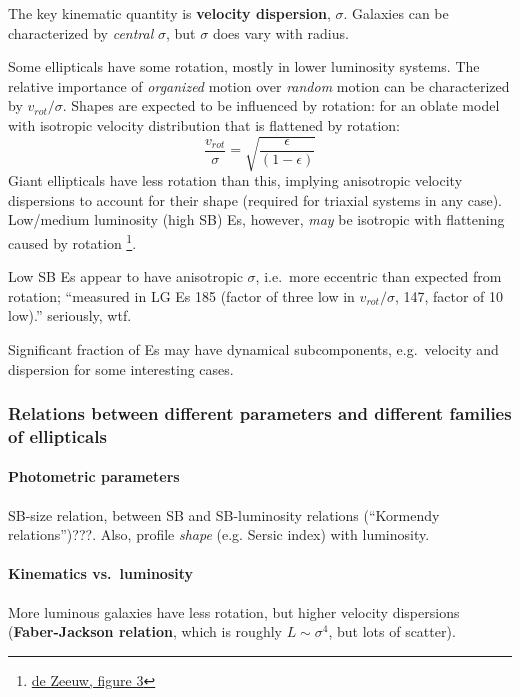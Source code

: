 \documentclass{article}
\newcommand{\mynotes}[1]{\textcolor{cadmiumgreen}{#1}}
\begin{document}
The key kinematic quantity is \textbf{velocity dispersion}, $\sigma$.
Galaxies can be characterized by \emph{central} $\sigma$, but $\sigma$ does
vary with radius.

Some ellipticals have some rotation, mostly in lower luminosity systems.
The relative importance of \emph{organized} motion over \emph{random} motion
can be characterized by $v_{rot}/\sigma$. Shapes are expected to be influenced
by rotation: for an oblate model with isotropic velocity distribution that is
flattened by rotation:
\[
    \frac{v_{rot}}{\sigma} = \sqrt{\frac{\epsilon}{\left(1-\epsilon\right)}}
    \]
Giant ellipticals have less rotation than this, implying anisotropic velocity
dispersions to account for their shape (required for triaxial systems in any
case). Low/medium luminosity (high SB) Es, however, \emph{may} be isotropic
with flattening caused by rotation
\footnote{
    \href{}
    {de Zeeuw, figure 3}
}.

Low SB Es appear to have anisotropic $\sigma$, i.e.\ more eccentric than
expected from rotation; ``measured in LG Es 185 (factor of three low in
$v_{rot}/\sigma$, 147, factor of 10 low).'' \mynotes{seriously, wtf}.

Significant fraction of Es may have dynamical subcomponents, e.g.\ velocity
and dispersion for some interesting cases.

\subsubsection{Relations between different parameters and different families
of ellipticals}

\paragraph{Photometric parameters}
SB-size relation, between SB and SB-luminosity relations
(``Kormendy relations'')\mynotes{???}.
Also, profile \emph{shape} (e.g. Sersic index) with luminosity.

\paragraph{Kinematics vs.\ luminosity}
More luminous galaxies have less rotation, but higher velocity dispersions
(\textbf{Faber-Jackson relation}, which is roughly $L\sim\sigma^{4}$, but
lots of scatter).
\end{document}
